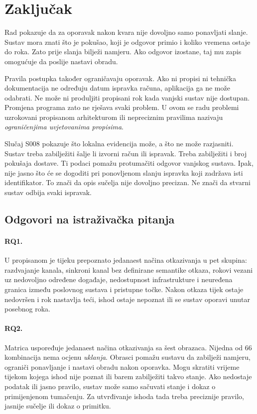 \section{Zaključak}
\label{ch:zakljucak}

Rad pokazuje da za oporavak nakon kvara nije dovoljno samo ponavljati
slanje. Sustav mora znati što je pokušao, koji je odgovor primio i koliko
vremena ostaje do roka. Zato prije slanja bilježi namjeru. Ako odgovor
izostane, taj mu zapis omogućuje da poslije nastavi obradu.

Pravila postupka također ograničavaju oporavak. Ako ni propisi ni tehnička
dokumentacija ne određuju datum ispravka računa, aplikacija ga ne može
odabrati. Ne može ni produljiti propisani rok kada vanjski sustav nije
dostupan. Promjena programa zato ne rješava svaki problem. U ovom se radu
problemi uzrokovani propisanom arhitekturom ili nepreciznim pravilima
nazivaju \emph{ograničenjima uvjetovanima propisima}.

Slučaj S008 pokazuje što lokalna evidencija može, a što ne može razjasniti.
Sustav treba zabilježiti šalje li izvorni račun ili ispravak. Treba
zabilježiti i broj pokušaja dostave. Ti podaci pomažu protumačiti odgovor
vanjskog sustava. Ipak, nije jasno što će se dogoditi pri ponovljenom slanju
ispravka koji zadržava isti identifikator. To znači da opis sučelja nije
dovoljno precizan. Ne znači da stvarni sustav odbija svaki ispravak.

\subsection*{Odgovori na istraživačka pitanja}

\paragraph{RQ1.}
U propisanom je tijeku prepoznato jedanaest načina otkazivanja u pet skupina:
razdvajanje kanala, sinkroni kanal bez definirane semantike otkaza, rokovi
vezani uz nedovoljno određene događaje, nedostupnost infrastrukture i neuređena
granica između poslovnog sustava i pristupne točke. Nakon otkaza tijek ostaje
nedovršen i rok nastavlja teći, ishod ostaje nepoznat ili se sustav oporavi
unutar posebnog roka.

\paragraph{RQ2.}
Matrica uspoređuje jedanaest načina otkazivanja sa šest obrazaca. Nijedna od
66 kombinacija nema ocjenu \emph{uklanja}. Obrasci pomažu sustavu da zabilježi
namjeru, ograniči ponavljanje i nastavi obradu nakon oporavka. Mogu skratiti
vrijeme tijekom kojega ishod nije poznat ili barem zabilježiti takvo stanje.
Ako nedostaje podatak ili jasno pravilo, sustav može samo sačuvati stanje i
dokaz o primijenjenom tumačenju. Za utvrđivanje ishoda tada treba preciznije
pravilo, jasnije sučelje ili dokaz o primitku.

